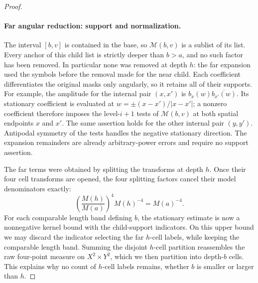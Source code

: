 \begin{proof}
\paragraph{Far angular reduction: support and normalization.}
The interval \([b,v]\) is contained in the base, so
\(\mathcal M(b,v)\) is a sublist of its list.  Every anchor of this
child list is strictly deeper than \(b>a\), and no such factor has
been removed.  In particular none was removed at depth \(h\): the
far expansion used the symbols before the removal made for the near
child.  Each coefficient differentiates the original masks only
angularly, so it retains all of their supports.  For example, the
amplitude for the internal pair \((x,x')\) is
\(b_x(w)\overline{b_{x'}(w)}\).  Its stationary coefficient is evaluated
at \(w=\pm(x-x')/|x-x'|\); a nonzero coefficient therefore imposes the
level-\(i+1\) tests of \(\mathcal M(b,v)\) at both spatial endpoints
\(x\) and \(x'\).  The same assertion holds for the other internal pair
\((y,y')\).  Antipodal symmetry of the tests handles the negative
stationary direction.  The expansion remainders are already
arbitrary-power errors and require no support assertion.

The far terms were obtained by splitting the transforms at depth
\(h\).  Once their four cell transforms are opened, the four splitting
factors cancel their model denominators exactly:
\[
 \left(\frac{M(h)}{M(a)}\right)^4M(h)^{-4}=M(a)^{-4}.
\]
For each comparable length band defining \(b\), the stationary estimate
is now a nonnegative kernel bound with the child-support indicators.
On this upper bound we may discard the indicator selecting the far
\(h\)-cell labels, while keeping the comparable length band.  Summing the
disjoint \(h\)-cell partition reassembles the raw four-point measure on
\(X^2\times Y^2\), which we then partition into depth-\(b\) cells.
This explains why no count of \(h\)-cell labels remains, whether \(b\)
is smaller or larger than \(h\).


\end{proof}
